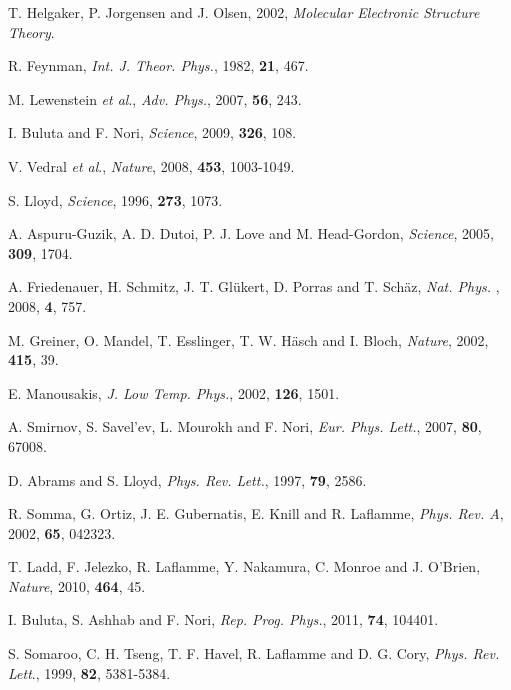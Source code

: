 \documentclass[8.5pt,twoside,twocolumn]{article}
\begin{document}
\footnotesize{
}
\begin{thebibliography}{99}
T. Helgaker, P. Jorgensen and J. Olsen, 2002, \emph{Molecular Electronic Structure Theory}.

R. Feynman, \emph{Int. J. Theor. Phys.}, 1982, \textbf{21}, 467.

M. Lewenstein \emph{et al}., \emph{Adv. Phys.}, 2007, \textbf{56}, 243.



I. Buluta and F. Nori, \emph{Science}, 2009, \textbf{326}, 108.

V. Vedral \emph{et al}., \emph{Nature}, 2008, \textbf{453}, 1003-1049.

S. Lloyd, \emph{Science}, 1996, \textbf{273}, 1073.

A. Aspuru-Guzik, A. D. Dutoi, P. J. Love and M. Head-Gordon, \emph{Science}, 2005, \textbf{309}, 1704.

A. Friedenauer, H. Schmitz, J. T. Gl\"{u}kert, D. Porras and T. Sch\"{a}z, \emph{Nat. Phys.} , 2008, \textbf{4}, 757.

M. Greiner, O. Mandel, T. Esslinger, T. W. H\"{a}sch and I. Bloch, \emph{Nature}, 2002, \textbf{415}, 39.

E. Manousakis, \emph{J. Low Temp. Phys.}, 2002, \textbf{126}, 1501.

A. Smirnov, S. Savel'ev, L. Mourokh and F. Nori, \emph{Eur. Phys. Lett.}, 2007, \textbf{80}, 67008.

D. Abrams and S. Lloyd, \emph{Phys. Rev. Lett.}, 1997, \textbf{79}, 2586.

R. Somma, G. Ortiz, J. E. Gubernatis, E. Knill and R. Laflamme, \emph{Phys. Rev. A}, 2002, \textbf{65}, 042323.

T. Ladd, F. Jelezko, R. Laflamme, Y. Nakamura, C. Monroe and J. O'Brien, \emph{Nature}, 2010, \textbf{464}, 45.

I. Buluta, S. Ashhab and F. Nori, \emph{Rep. Prog. Phys.}, 2011, \textbf{74}, 104401.

S. Somaroo, C. H. Tseng, T. F. Havel, R. Laflamme and D. G. Cory, \emph{Phys. Rev. Lett}., 1999, \textbf{82}, 5381-5384.


\end{thebibliography}
\end{document}
